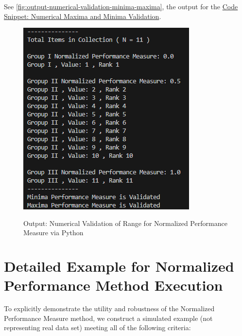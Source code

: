 \documentclass[a4paper,fleqn,review]{cas-sc}
\begin{document}
See \autoref{fig:output-numerical-validation-minima-maxima}, the output for the \hyperref[code:numerical-validation-minima-maxima]{Code Snippet: Numerical Maxima and Minima Validation}.
\begin{figure}
	\caption{Output: Numerical Validation of Range for Normalized Performance Measure via Python}
	\centering
	\includegraphics [scale=0.75]{output-validation-minima-maxima.png}
	\label{fig:output-numerical-validation-minima-maxima}
\end{figure}


\section{Detailed Example for Normalized Performance Method Execution}

To explicitly demonstrate the utility and robustness of the Normalized Performance Measure method, we construct a simulated example (not representing real data set) meeting all of the following criteria:
\end{document}
